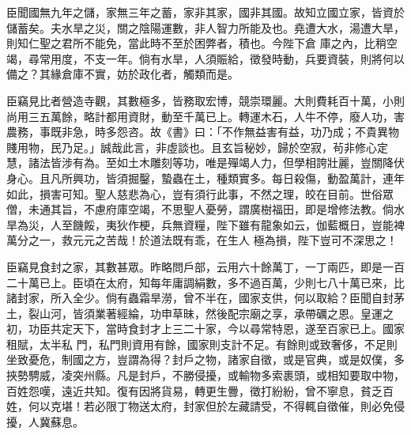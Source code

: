 \begin{pinyinscope}
 臣聞國無九年之儲，家無三年之蓄，家非其家，國非其國。故知立國立家，皆資於儲蓄矣。夫水旱之災，關之陰陽運數，非人智力所能及也。堯遭大水，湯遭大旱，則知仁聖之君所不能免，當此時不至於困弊者，積也。今陛下倉
 庫之內，比稍空竭，尋常用度，不支一年。倘有水旱，人須賑給，徵發時動，兵要資裝，則將何以備之？其緣倉庫不實，妨於政化者，觸類而是。



 臣竊見比者營造寺觀，其數極多，皆務取宏博，競崇環麗。大則費耗百十萬，小則尚用三五萬餘，略計都用資財，動至千萬已上。轉運木石，人牛不停，廢人功，害農務，事既非急，時多怨咨。故《書》曰：「不作無益害有益，功乃成；不貴異物賤用物，民乃足。」誠哉此言，非虛談也。且玄旨秘妙，歸於空寂，茍非修心定
 慧，諸法皆涉有為。至如土木雕刻等功，唯是殫竭人力，但學相誇壯麗，豈關降伏身心。且凡所興功，皆須掘鑿，蟄蟲在土，種類實多。每日殺傷，動盈萬計，連年如此，損害可知。聖人慈悲為心，豈有須行此事，不然之理，皎在目前。世俗眾僧，未通其旨，不慮府庫空竭，不思聖人憂勞，謂廣樹福田，即是增修法教。倘水旱為災，人至饑餒，夷狄作梗，兵無資糧，陛下雖有龍象如云，伽藍概日，豈能裨萬分之一，救元元之苦哉！於道法既有乖，在生人
 極為損，陛下豈可不深思之！



 臣竊見食封之家，其數甚眾。昨略問戶部，云用六十餘萬丁，一丁兩匹，即是一百二十萬已上。臣頃在太府，知每年庸調絹數，多不過百萬，少則七八十萬已來，比諸封家，所入全少。倘有蟲霜旱澇，曾不半在，國家支供，何以取給？臣聞自封茅土，裂山河，皆須業著經綸，功申草昧，然後配宗廟之享，承帶礪之恩。皇運之初，功臣共定天下，當時食封才上三二十家，今以尋常特恩，遂至百家已上。國家租賦，太半私
 門，私門則資用有餘，國家則支計不足。有餘則或致奢侈，不足則坐致憂危，制國之方，豈謂為得？封戶之物，諸家自徵，或是官典，或是奴僕，多挾勢騁威，凌突州縣。凡是封戶，不勝侵擾，或輸物多索裹頭，或相知要取中物，百姓怨嘆，遠近共知。復有因將貨易，轉更生釁，徵打紛紛，曾不寧息，貧乏百姓，何以克堪！若必限丁物送太府，封家但於左藏請受，不得輒自徵催，則必免侵擾，人冀蘇息。




\end{pinyinscope}
